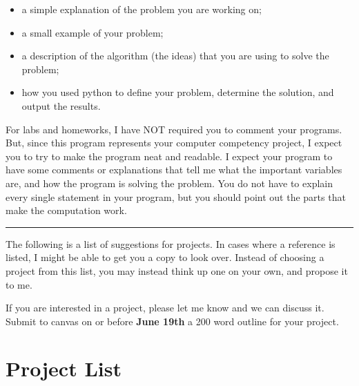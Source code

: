 \documentclass{article}
\begin{document}
\begin{itemize}
    \item  a simple explanation of the problem you are working on;
    \item a small example of your problem;
    \item a description of the algorithm (the ideas) that you are using to solve the problem;
    \item how you used python to define your problem, determine the solution, and output the results.
\end{itemize}

For labs and homeworks, I have NOT required you to comment your programs. But, since this program represents your computer competency project, I expect you to try to make the program neat and readable. I expect your program to have some comments or explanations that tell me what the important variables are, and how the program is solving the problem. You do not have to explain every single statement in your program, but you should point out the parts that make the computation work.

\par\noindent\rule{\textwidth}{0.4pt}

The following is a list of suggestions for projects. In cases where a reference is listed, I might be able to get you a copy to look over. Instead of choosing a project from this list, you may instead think up one on your own, and propose it to me.

If you are interested in a project, please let me know and we can discuss it. Submit to canvas on or before \textbf{June 19th} a 200 word outline for your project.

\section*{Project List}
\end{document}
